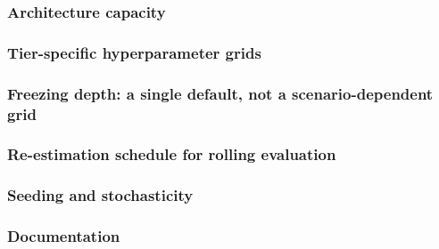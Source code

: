 \subsubsection{Architecture capacity}
\subsubsection{Tier-specific hyperparameter grids}
\subsubsection{Freezing depth: a single default, not a scenario-dependent grid}
\subsubsection{Re-estimation schedule for rolling evaluation}
\subsubsection{Seeding and stochasticity}
\subsubsection{Documentation}


